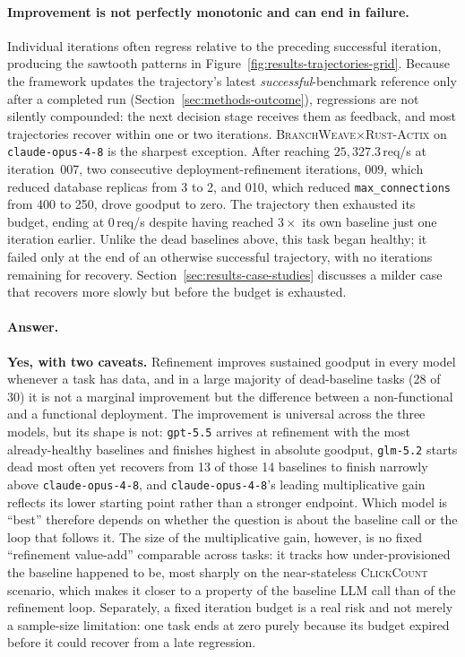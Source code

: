 \paragraph{Improvement is not perfectly monotonic and can end in failure.}
Individual iterations often regress relative to the preceding successful
iteration, producing the sawtooth patterns in
Figure~\ref{fig:results-trajectories-grid}. Because the framework
updates the trajectory's latest \emph{successful}-benchmark reference
only after a completed run (Section~\ref{sec:methods-outcome}),
regressions are not silently
compounded: the next decision stage receives them as feedback, and most
trajectories recover within one or two iterations.
\textsc{BranchWeave}$\times$\textsc{Rust-Actix} on \texttt{claude-opus-4-8}
is the sharpest exception. After reaching $25{,}327.3$\,req/s at
iteration~007, two consecutive deployment-refinement iterations, 009, which
reduced database replicas from 3 to 2, and 010, which reduced
\texttt{max\_connections} from 400 to 250, drove goodput to zero. The
trajectory then exhausted its budget, ending at $0$\,req/s despite having
reached $3\times$ its own baseline just one iteration earlier. Unlike the
dead baselines above, this task began healthy; it failed only at the end
of an otherwise successful trajectory, with no iterations remaining for
recovery. Section~\ref{sec:results-case-studies} discusses a milder case
that recovers more slowly but before the budget is exhausted.

\paragraph{Answer.}
\textbf{Yes, with two caveats.} Refinement improves sustained goodput in
every model whenever a task has data, and in a large majority of
dead-baseline tasks (28 of 30) it is not a marginal improvement but the
difference between a non-functional and a functional deployment. The
improvement is universal across the three models, but its shape is not:
\texttt{gpt-5.5} arrives at refinement with the most already-healthy
baselines and finishes highest in absolute goodput, \texttt{glm-5.2}
starts dead most often yet recovers from 13 of those 14 baselines to
finish narrowly above \texttt{claude-opus-4-8}, and
\texttt{claude-opus-4-8}'s leading multiplicative gain reflects its lower
starting point rather than a stronger endpoint. Which model is ``best''
therefore depends on whether the question is about the baseline call or
the loop that follows it. The size
of the multiplicative gain, however, is no fixed ``refinement value-add''
comparable across tasks: it tracks how under-provisioned the baseline
happened to be, most sharply on the near-stateless \textsc{ClickCount}
scenario, which makes it closer to a property of the baseline LLM call
than of the refinement loop. Separately, a fixed iteration budget is a
real risk and not merely a sample-size limitation: one task ends at zero
purely because its budget expired before it could recover from a late
regression.


